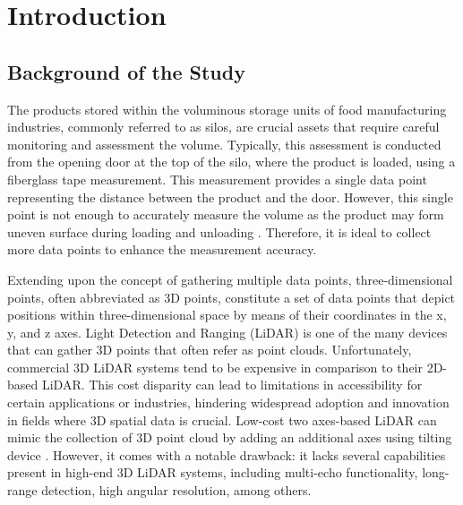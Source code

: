 \renewcommand{\thechapter}{\Roman{chapter}}
\chapter{Introduction}
\renewcommand{\thechapter}{\arabic{chapter}}
\label{ch:Introduction}
\thispagestyle{empty}

\section{Background of the Study}
\label{intro:sec:Background of the Study}
The products stored within the voluminous storage units of food manufacturing industries, commonly referred to as silos, are crucial assets that require careful monitoring and assessment the volume. Typically, this assessment is conducted from the opening door at the top of the silo, where the product is loaded, using a fiberglass tape measurement. This measurement provides a single data point representing the distance between the product and the door. However, this single point is not enough to accurately measure the volume as the product may form uneven surface during loading and unloading \citep{turner2016}. Therefore, it is ideal to collect more data points to enhance the measurement accuracy. 

Extending upon the concept of gathering multiple data points, three-dimensional points, often abbreviated as 3D points, constitute a set of data points that depict positions within three-dimensional space by means of their coordinates in the x, y, and z axes. Light Detection and Ranging (LiDAR) is one of the many devices that can gather 3D points that often refer as point clouds. Unfortunately, commercial 3D LiDAR systems tend to be expensive in comparison to their 2D-based LiDAR. This cost disparity can lead to limitations in accessibility for certain applications or industries, hindering widespread adoption and innovation in fields where 3D spatial data is crucial. Low-cost two axes-based LiDAR can mimic the collection of 3D point cloud by adding an additional axes using tilting device \citep{clar2022}. However, it comes with a notable drawback: it lacks several capabilities present in high-end 3D LiDAR systems, including multi-echo functionality, long-range detection, high angular resolution, among others.


